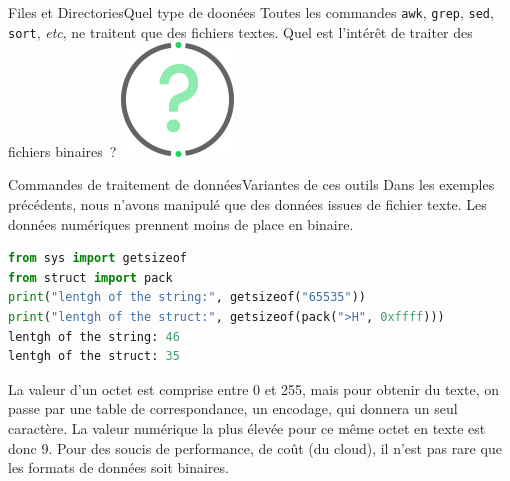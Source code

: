 \documentclass{beamer}
\begin{document}
    \begin{frame}{Files et Directories}{Quel type de doonées}
        Toutes les commandes \lstinline{awk}, \lstinline{grep}, \lstinline{sed}, \lstinline{sort}, \textit{etc}, ne traitent que des fichiers textes.
        \bigbreak
        Quel est l'intérêt de traiter des fichiers binaires~?
        \bigbreak
        \centering
        \includegraphics[width=3cm]{image/question-mark}
    \end{frame}

    \begin{frame}[fragile]{Commandes de traitement de données}{Variantes de ces outils}
        Dans les exemples précédents, nous n'avons manipulé que des données issues de fichier texte.
        Les données numériques prennent moins de place en binaire.
        \begin{lstlisting}[language=python]
from sys import getsizeof
from struct import pack
print("lentgh of the string:", getsizeof("65535"))
print("lentgh of the struct:", getsizeof(pack(">H", 0xffff)))
lentgh of the string: 46
lentgh of the struct: 35
        \end{lstlisting}
        La valeur d'un octet est comprise entre 0 et 255, mais pour obtenir du texte, on passe par une table de correspondance, un encodage, qui donnera un seul caractère.
        La valeur numérique la plus élevée pour ce même octet en texte est donc 9.
        \bigbreak
        Pour des soucis de performance, de coût (du cloud), il n'est pas rare que les formats de données soit binaires.
    \end{frame}
\end{document}

